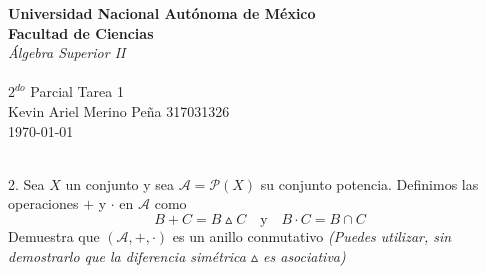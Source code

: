 \documentclass[letterpaper]{article}
\renewcommand{\*}{\cdot}
\theoremstyle{definition}
\begin{document}
		\begin{titlepage}
	\begin{center}
		\textbf{Universidad Nacional Autónoma de México}\\
		\textbf{Facultad de Ciencias} \\
		\textit{Álgebra Superior II} \\[1mm]
		\hrulefill \\
		\large{$ 2^{do} $ Parcial Tarea 1 }\\
		Kevin Ariel Merino Peña  317031326\\
		\today\\
		\hrulefill \\
	\end{center}
	\let\newpage\relax%
	
\end{titlepage}

2. Sea $ X $ un conjunto y sea $ \mathcal{A} = \mathcal{P}(X) $ su conjunto potencia. Definimos las operaciones $ + $ y $ \* $ en $ \mathcal{A} $ como 
\[ B + C = B \vartriangle C \quad \text{y} \quad B \* C = B \cap C \]
Demuestra que $ (\mathcal{A}, +, \*) $ es un anillo conmutativo
\textit{(Puedes utilizar, sin demostrarlo que la diferencia simétrica $ \vartriangle $ es asociativa)}
\end{document}
